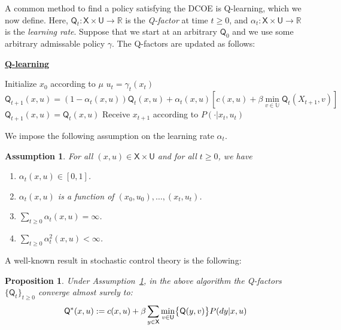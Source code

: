 \documentclass[conference, draftcls, onecolumn]{IEEEtran}
\newtheorem{proposition}{Proposition}
\newtheorem{assumption}{Assumption}
\begin{document}
A common method to find a policy satisfying the DCOE is Q-learning, which we now define. Here, \(\mathsf{Q}_t : \mathsf{X} \times \mathsf{U} \to \mathbb{R} \) is the \emph{Q-factor} at time \(t\ge0\), and \(\alpha_t : \mathsf{X} \times \mathsf{U} \to \mathbb{R}\) is the \emph{learning rate}. Suppose that we start at an arbitrary \(\mathsf{Q}_0\) and we use some arbitrary admissable policy \(\gamma\). The Q-factors are updated as follows:

\vspace{1em}

\noindent \underline{\textbf{Q-learning}}\label{algorithm:Q-learning}

\begin{algorithmic}[1]
    \STATE Initialize \(x_0\) according to \(\mu\)
    \STATE \(u_t = \gamma_t(x_t)\)
    \STATE \(\mathsf{Q}_{t+1}(x,u) = (1- \alpha_t(x,u))\mathsf{Q}_t(x,u) + \alpha_t(x,u)[c(x,u)+\beta \; \underset{v\in\mathbb{U}}{\text{min}} \; \mathsf{Q}_t(X_{t+1},v)]\)
    \ELSE
    \STATE \(\mathsf{Q}_{t+1}(x,u) = \mathsf{Q}_t(x,u)\)
    \ENDIF
    \STATE Receive \(x_{t+1}\) according to \(P(\cdot | x_t, u_t)\)
    \ENDFOR
\end{algorithmic}

We impose the following assumption on the learning rate \(\alpha_t\).

\begin{assumption}\label{assumption:alpha}
    For all \((x,u) \in \mathsf{X} \times \mathsf{U}\) and for all \(t\ge0\), we have
    \begin{enumerate}
        \item \(\alpha_t(x,u) \in [0,1]\).
        \item \(\alpha_t(x,u) \) is a function of \((x_0,u_0),\ldots,(x_t,u_t)\).
        \item \(\sum_{t\ge0}\alpha_t(x,u) = \infty\).
        \item \(\sum_{t\ge0}\alpha_t^2(x,u) < \infty\).
    \end{enumerate}
\end{assumption}

A well-known result in stochastic control theory is the following:
\begin{proposition}\cite{Watkins}
    Under Assumption~\ref{assumption:alpha}, in the above algorithm the Q-factors \(\{\mathsf{Q}_t\}_{t\ge0}\) converge almost surely to:
    \[\mathsf{Q}^*(x,u) := c(x,u) \\ + \beta\sum_{y \in \mathsf{X}}\min_{v\in\mathsf{U}}\bigl\{\mathsf{Q}(y,v)\bigl\}P(dy | x,u)\]
\end{proposition}
\end{document}
